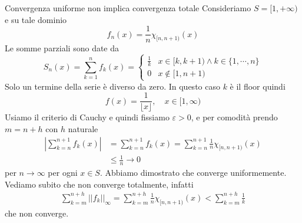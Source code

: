 \documentclass[a4paper]{article}
\begin{document}
\begin{center}
\end{center}

\begin{snippetexample}{Convergenza uniforme non implica convergenza totale}
    Consideriamo \(S = [1, +\infty)\)
    e su tale dominio
    \[
        f_n(x) = \frac1n \chi_{[n, n+1)}(x)
    \]
    Le somme parziali sono date da
    \[
        S_n(x) = \sum_{k=1}^n f_k(x) = \begin{cases}
            \frac1k & x \in [k, k+1) \land k \in \{1,\cdots, n\} \\
            0 & x \notin [1, n+1)
        \end{cases}
    \]
    Solo un termine della serie è diverso da zero.
    In questo caso \(k\) è il floor quindi
    \[
        f(x) = \frac{1}{\lfloor x \rfloor}, \quad x \in [1, \infty)
    \]
    Usiamo il criterio di Cauchy e quindi fissiamo \(\varepsilon > 0\),
    e per comodità prendo \(m=n+h\) con \(h\) naturale
    \begin{align*}
        \left| \sum_{k=n}^{n+1} f_k(x) \right|
        &= \sum_{k=n}^{n+1} f_k(x) = \sum_{k=n}^{n+1} \frac1n \chi_{[n, n+1)}(x) \\
        &\leq \frac{1}{n} \to 0
    \end{align*}
    per \(n \to \infty\) per ogni \(x \in S\).
    Abbiamo dimostrato che converge uniformemente.
    Vediamo subito che non converge totalmente, infatti
    \begin{align*}
        \sum_{k=m}^{n+h} ||f_k||_\infty = \sum_{k=m}^{n+h} \frac1n \chi_{[n, n+1)}(x)
        < \sum_{k=m}^{n+h} \frac{1}{k}
    \end{align*}
    che non converge.
\end{snippetexample}
\end{document}

